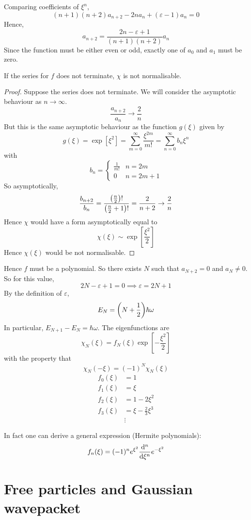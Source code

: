 \documentclass[a4paper]{article}
\begin{document}
Comparing coefficients of \( \xi^n \),
\[
	(n+1)(n+2) a_{n+2} - 2n a_n + (\varepsilon - 1) a_n = 0
\]
Hence,
\[
	a_{n+2} = \frac{2n - \varepsilon + 1}{(n+1)(n+2)} a_n
\]
Since the function must be either even or odd, exactly one of \( a_0 \) and \( a_1 \) must be zero.
\begin{proposition}
	If the series for \( f \) does not terminate, \( \chi \) is not normalisable.
\end{proposition}
\begin{proof}
	Suppose the series does not terminate.
	We will consider the asymptotic behaviour as \( n \to \infty \).
	\[
		\frac{a_{n+2}}{a_n} \to \frac{2}{n}
	\]
	But this is the same asymptotic behaviour as the function \( g(\xi) \) given by
	\[
		g(\xi) = \exp[\xi^2] = \sum_{m=0}^\infty \frac{\xi^{2m}}{m!} = \sum_{n=0}^\infty b_n \xi^n
	\]
	with
	\[
		b_n = \begin{cases}
			\frac{1}{m!} & n = 2m     \\
			0            & n = 2m + 1
		\end{cases}
	\]
	So asymptotically,
	\[
		\frac{b_{n+2}}{b_n} = \frac{\qty(\frac{n}{2})!}{\qty(\frac{n}{2} + 1)!} = \frac{2}{n+2} \to \frac{2}{n}
	\]
	Hence \( \chi \) would have a form asymptotically equal to
	\[
		\chi(\xi) \sim \exp[\frac{\xi^2}{2}]
	\]
	Hence \( \chi(\xi) \) would be not normalisable.
\end{proof}
Hence \( f \) must be a polynomial.
So there exists \( N \) such that \( a_{N+2} = 0 \) and \( a_N \neq 0 \).
So for this value,
\[
	2N - \varepsilon + 1 = 0 \implies \varepsilon = 2N + 1
\]
By the definition of \( \varepsilon \),
\[
	E_N = \qty(N + \frac{1}{2}) \hbar \omega
\]
In particular, \( E_{N+1} - E_N = \hbar \omega \).
The eigenfunctions are
\[
	\chi_N(\xi) = f_N(\xi) \exp[-\frac{\xi^2}{2}]
\]
with the property that
\[
	\chi_N(-\xi) = (-1)^N \chi_N(\xi)
\]
\begin{align*}
	f_0(\xi) & = 1                      \\
	f_1(\xi) & = \xi                    \\
	f_2(\xi) & = 1 - 2 \xi^2            \\
	f_3(\xi) & = \xi - \frac{2}{3}\xi^3 \\
	         & \vdots
\end{align*}

In fact one can derive a general expression (Hermite polynomials):
\[
f_n(\xi)=(-1)^n e^{\xi^2} \frac{\mathrm{d}^n}{\mathrm{d} \xi^n} e^{-\xi^2}
\]

\section{Free particles and Gaussian wavepacket}
\end{document}

